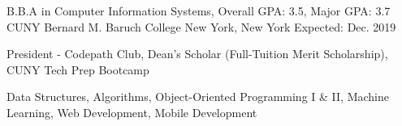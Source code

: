 


\begin{cventries}


\cventry
{B.B.A in Computer Information Systems, Overall GPA: 3.5, Major GPA: 3.7} %
{CUNY Bernard M. Baruch College} %
{New York, New York} %
{Expected: Dec. 2019} %
{ %
\begin{cvitems}
\item {President - Codepath Club, Dean's Scholar (Full-Tuition Merit Scholarship), CUNY Tech Prep Bootcamp }
\item {Data Structures, Algorithms, Object-Oriented Programming I \& II, Machine Learning, Web Development, Mobile Development }
\end{cvitems}
}


\end{cventries}
